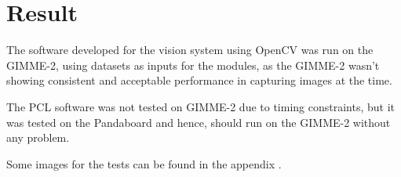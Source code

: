 \section{Result}\label{sec:result}
The software developed for the vision system using OpenCV was run on the GIMME-2, using datasets as inputs for the modules, as the GIMME-2 wasn't showing consistent and acceptable performance in capturing images at the time. 

The PCL software was not tested on GIMME-2 due to timing constraints, but it was tested on the Pandaboard and hence, should run on the GIMME-2 without any problem.

Some images for the tests can be found in the appendix \label{vision_appendix_A}.